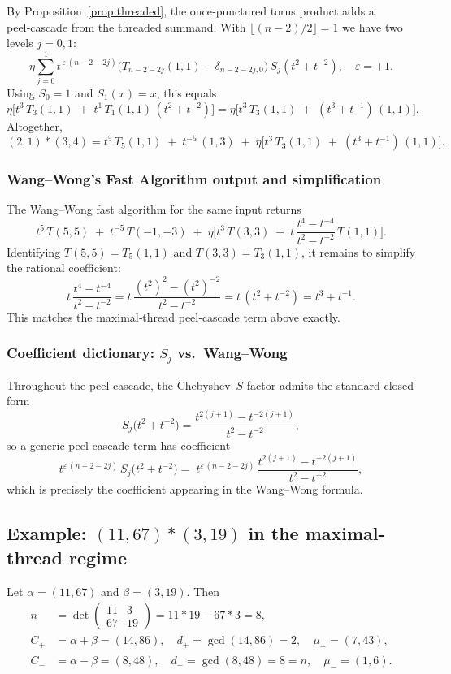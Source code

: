 \documentclass[12pt]{article}
\begin{document}
By Proposition~\ref{prop:threaded}, the once‑punctured torus product adds a peel‑cascade from the threaded summand. With $\lfloor(n-2)/2\rfloor=1$ we have two levels $j=0,1$:
\[
\eta\!\sum_{j=0}^{1} t^{\,\varepsilon\,(n-2-2j)}
\Big(T_{n-2-2j}(1,1)-\delta_{n-2-2j,0}\Big)\,S_j(t^{2}+t^{-2}),
\quad \varepsilon=+1.
\]
Using $S_{0}=1$ and $S_{1}(x)=x$, this equals
\[
\eta\Big[ t^{3}\,T_{3}(1,1)\;+\;t^{1}\,T_{1}(1,1)\,(t^{2}+t^{-2})\Big]
=\eta\Big[ t^{3}\,T_{3}(1,1)\;+\;(t^{3}+t^{-1})\,(1,1)\Big].
\]
Altogether,
\[
(2,1)\ast(3,4)
= t^{5}\,T_{5}(1,1)\;+\;t^{-5}\,(1,3)
\;+\;\eta\Big[ t^{3}\,T_{3}(1,1)\;+\;(t^{3}+t^{-1})\,(1,1)\Big].
\]

\subsubsection*{Wang--Wong's Fast Algorithm output and simplification}
The Wang--Wong fast algorithm for the same input returns
\[
t^{5}\,T(5,5)\;+\;t^{-5}\,T(-1,-3)
\;+\;\eta\Big[ t^{3}\,T(3,3)\;+\;t\,\frac{t^{4}-t^{-4}}{t^{2}-t^{-2}}\,T(1,1)\Big].
\]
Identifying $T(5,5)=T_{5}(1,1)$ and $T(3,3)=T_{3}(1,1)$, it remains to simplify the rational coefficient:
\[
t\,\frac{t^{4}-t^{-4}}{t^{2}-t^{-2}}
= t\,\frac{(t^{2})^{2}-(t^{2})^{-2}}{t^{2}-t^{-2}}
= t\,(t^{2}+t^{-2})
= t^{3}+t^{-1}.
\]
This matches the maximal‑thread peel‑cascade term above exactly.

\subsubsection*{Coefficient dictionary: \texorpdfstring{$S_j$}{Sj} vs.\ Wang--Wong}
Throughout the peel cascade, the Chebyshev--$S$ factor admits the standard closed form
\[
S_j\big(t^{2}+t^{-2}\big)
=\frac{t^{2(j+1)}-t^{-2(j+1)}}{t^{2}-t^{-2}},
\]
so a generic peel‑cascade term has coefficient
\[
t^{\varepsilon\,(n-2-2j)}\,S_j\big(t^{2}+t^{-2}\big)
=\;t^{\varepsilon\,(n-2-2j)}\,
\frac{t^{2(j+1)}-t^{-2(j+1)}}{t^{2}-t^{-2}},
\]
which is precisely the coefficient appearing in the Wang--Wong formula.








\subsection*{Example: \texorpdfstring{$(11,67)\ast(3,19)$}{(11,67)\ast(3,19)} in the maximal-thread regime}

Let $\alpha=(11,67)$ and $\beta=(3,19)$. Then
\begin{align}
n &= \det\!\begin{pmatrix}11&3\\ 67&19\end{pmatrix} = 11\ast 19-67\ast 3 = 8, \\
C_{+} &= \alpha+\beta = (14,86), \quad d_{+} = \gcd(14,86) = 2, \quad \mu_{+} = (7,43), \\
C_{-} &= \alpha-\beta = (8,48), \quad d_{-} = \gcd(8,48) = 8 = n, \quad \mu_{-} = (1,6).
\end{align}
\end{document}
